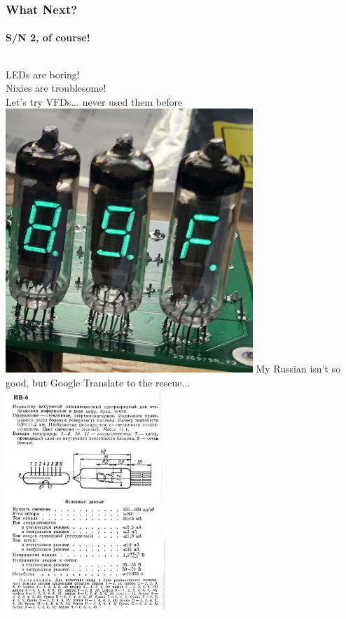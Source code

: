 \documentclass{beamer}
\newcommand{\tred}[1]{\textcolor{my-red}{#1}}
\newcommand{\tgreen}[1]{\textcolor{my-green}{#1}}
\newcommand{\tblue}[1]{\textcolor{my-blue}{#1}}
\begin{document}
\begin{frame}
  \frametitle{What Next?}
  \framesubtitle{S/N 2, of course!}

  \scriptsize

  \begin{columns}
    \tgreen{LEDs are boring! \\ Nixies are troublesome!} \\
    \vskip 0.1in
    \tred{Let's try VFDs... never used them before} \\
    \vskip 0.5in
    \includegraphics[width=0.7\textwidth]{figs/vfd-closeup.jpg}
    \tblue{My Russian isn't so good, but Google Translate to the rescue...} \\
    \vskip 0.2in
    \includegraphics[width=0.45\textwidth]{figs/iv-6-datasheet.jpg}

\end{columns}
\end{frame}
\end{document}
